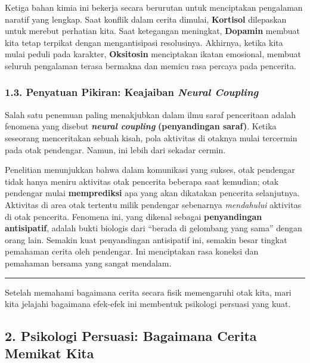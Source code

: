 \documentclass[
  letterpaper,
  DIV=11,
  numbers=noendperiod]{scrreprt}
\begin{document}
Ketiga bahan kimia ini bekerja secara berurutan untuk menciptakan
pengalaman naratif yang lengkap. Saat konflik dalam cerita dimulai,
\textbf{Kortisol} dilepaskan untuk merebut perhatian kita. Saat
ketegangan meningkat, \textbf{Dopamin} membuat kita tetap terpikat
dengan mengantisipasi resolusinya. Akhirnya, ketika kita mulai peduli
pada karakter, \textbf{Oksitosin} menciptakan ikatan emosional, membuat
seluruh pengalaman terasa bermakna dan memicu rasa percaya pada
pencerita.

\subsubsection{\texorpdfstring{1.3. Penyatuan Pikiran: Keajaiban
\emph{Neural
Coupling}}{1.3. Penyatuan Pikiran: Keajaiban Neural Coupling}}\label{penyatuan-pikiran-keajaiban-neural-coupling}

Salah satu penemuan paling menakjubkan dalam ilmu saraf penceritaan
adalah fenomena yang disebut \textbf{\emph{neural coupling}}
\textbf{(penyandingan saraf)}. Ketika seseorang menceritakan sebuah
kisah, pola aktivitas di otaknya mulai tercermin pada otak pendengar.
Namun, ini lebih dari sekadar cermin.

Penelitian menunjukkan bahwa dalam komunikasi yang sukses, otak
pendengar tidak hanya meniru aktivitas otak pencerita beberapa saat
kemudian; otak pendengar mulai \textbf{memprediksi} apa yang akan
dikatakan pencerita selanjutnya. Aktivitas di area otak tertentu milik
pendengar sebenarnya \emph{mendahului} aktivitas di otak pencerita.
Fenomena ini, yang dikenal sebagai \textbf{penyandingan antisipatif},
adalah bukti biologis dari ``berada di gelombang yang sama'' dengan
orang lain. Semakin kuat penyandingan antisipatif ini, semakin besar
tingkat pemahaman cerita oleh pendengar. Ini menciptakan rasa koneksi
dan pemahaman bersama yang sangat mendalam.

\begin{center}\rule{0.5\linewidth}{0.5pt}\end{center}

Setelah memahami bagaimana cerita secara fisik memengaruhi otak kita,
mari kita jelajahi bagaimana efek-efek ini membentuk psikologi persuasi
yang kuat.

\subsection{2. Psikologi Persuasi: Bagaimana Cerita Memikat
Kita}\label{psikologi-persuasi-bagaimana-cerita-memikat-kita}
\end{document}
